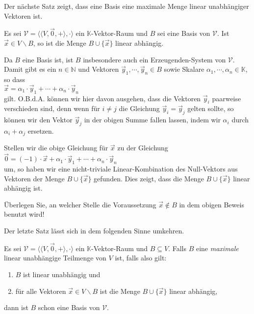 \noindent
Der n\"{a}chste Satz zeigt, dass eine Basis eine {\color{red}maximale} Menge linear unabh\"{a}ngiger Vektoren ist.

\begin{Satz}
  Es sei $\mathcal{V} = \bigl\langle \langle V, \vec{0}, + \rangle, \cdot \bigr\rangle$ 
  ein $\mathbb{K}$-Vektor-Raum und $B$ sei eine Basis von $\mathcal{V}$.  Ist $\vec{x} \in V \backslash B$,
  so ist die Menge $B \cup \{ \vec{x} \}$ linear abh\"{a}ngig.
\end{Satz}

\proof
Da $B$ eine Basis ist, ist $B$ insbesondere auch ein Erzeugenden-System von $\mathcal{V}$.  Damit gibt es ein
$n \in \mathbb{N}$ und Vektoren $\vec{y}_1,\cdots,\vec{y}_n \in B$ sowie Skalare $\alpha_1, \cdots,\alpha_n \in \mathbb{K}$,
so dass
\\[0.2cm]
\hspace*{1.3cm}
$\vec{x} = \alpha_1 \cdot \vec{y}_1 + \cdots + \alpha_n \cdot \vec{y}_n$
\\[0.2cm]
gilt.  O.B.d.A. k\"{o}nnen wir hier davon ausgehen, dass die Vektoren $\vec{y}_i$ paarweise
verschieden sind, denn wenn f\"{u}r $i\not= j$ die Gleichung $\vec{y}_i = \vec{y}_j$
gelten sollte, so k\"{o}nnen wir den Vektor $\vec{y}_j$ in der obigen Summe fallen lassen,
indem wir $\alpha_i$ durch $\alpha_i + \alpha_j$ ersetzen.

Stellen wir die obige Gleichung f\"{u}r $\vec{x}$ zu der Gleichung
\\[0.2cm]
\hspace*{1.3cm}
$\vec{0} = (-1) \cdot \vec{x} + \alpha_1 \cdot \vec{y}_1 + \cdots + \alpha_n \cdot \vec{y}_n$
\\[0.2cm]
um, so haben wir eine nicht-triviale Linear-Kombination des Null-Vektors aus Vektoren der Menge 
$B \cup \{ \vec{x} \}$ gefunden.  Dies zeigt, dass die Menge $B \cup \{ \vec{x} \}$ linear abh\"{a}ngig
ist. \qeds

\exercise
\"{U}berlegen Sie, an welcher Stelle die Voraussetzung $\vec{x} \not\in B$ in dem obigen Beweis benutzt wird!
\eoxs

\noindent
Der letzte Satz l\"{a}sst sich in dem folgenden Sinne umkehren.

\begin{Satz}
  Es sei $\mathcal{V} = \bigl\langle \langle V, \vec{0}, + \rangle, \cdot \bigr\rangle$ ein $\mathbb{K}$-Vektor-Raum 
  und $B \subseteq V$.  Falls $B$ eine \emph{\color{blue}maximale} linear 
  unabh\"{a}ngige Teilmenge von $V$ ist, falls also gilt:
  \begin{enumerate}
  \item $B$ ist linear unabh\"{a}ngig und
  \item f\"{u}r alle Vektoren $\vec{x} \in V \backslash B$ ist die Menge $B \cup \{ \vec{x} \}$
        linear abh\"{a}ngig,
  \end{enumerate}
  dann ist $B$ schon eine Basis von $\mathcal{V}$.
\end{Satz}

